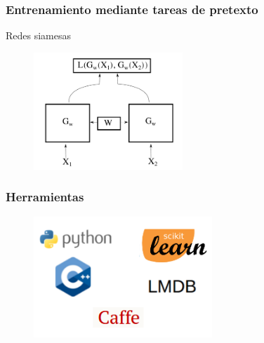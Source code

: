 \documentclass{beamer}
\begin{document}
\begin{frame}
\frametitle{Entrenamiento mediante tareas de pretexto}
Redes siamesas\\
\begin{figure}
    \centering
    \includegraphics[width=0.5\textwidth]{images/siamese-diagram.pdf}
\end{figure}
\end{frame}





\begin{frame}
\frametitle{Herramientas}
\begin{figure}
    \centering
    \includegraphics[width=0.6\textwidth]{images/tools.png}
\end{figure}
\end{frame}
\end{document}
